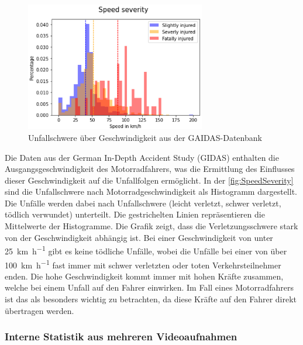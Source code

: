 \begin{figure}[htpb]
	\centering
	\includegraphics[width=0.7\textwidth]{Bilder/SpeedSeverity.png}
	\caption{Unfallschwere über Geschwindigkeit aus der GAIDAS-Datenbank \citep{Maire2020}}
	\label{fig:SpeedSeverity}
\end{figure}
Die Daten aus der German In-Depth Accident Study (GIDAS) enthalten die Ausgangsgeschwindigkeit des Motorradfahrers, was die Ermittlung des Einflusses dieser Geschwindigkeit auf die Unfallfolgen ermöglicht. In der \autoref{fig:SpeedSeverity} sind die Unfallschwere nach Motorradgeschwindigkeit als Histogramm dargestellt. Die Unfälle werden dabei nach Unfallschwere (leicht verletzt, schwer verletzt, tödlich verwundet) unterteilt. Die gestrichelten Linien repräsentieren die Mittelwerte der Histogramme.
Die Grafik zeigt, dass die Verletzungsschwere stark von der Geschwindigkeit abhängig ist. Bei einer Geschwindigkeit von unter \SI[per-mode = symbol]{25}{\kilo\meter\per\hour} gibt es keine tödliche Unfälle, wobei die Unfälle bei einer von über \SI[per-mode = symbol]{100}{\kilo\meter\per\hour} fast immer mit schwer verletzten oder toten Verkehrsteilnehmer enden. Die hohe Geschwindigkeit kommt immer mit hohen Kräfte zusammen, welche bei einem Unfall auf den Fahrer einwirken. Im Fall eines Motorradfahrers ist das als besonders wichtig zu betrachten, da diese Kräfte auf den Fahrer direkt übertragen werden. \citep{Maire2020}


%
%
%

\subsubsection{Interne Statistik aus mehreren Videoaufnahmen}



